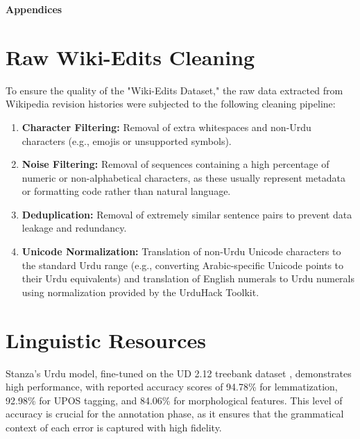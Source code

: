 \documentclass[11pt]{article}
\begin{document}
\begin{center}
    \textbf{\Large Appendices}
\end{center}
\noindent
\begin{appendices}
\section{Raw Wiki-Edits Cleaning}
\label{sec:Raw_Wiki-Edits_Cleaning}
To ensure the quality of the "Wiki-Edits Dataset," the raw data extracted from Wikipedia revision histories were subjected to the following cleaning pipeline:
\begin{enumerate}
\setlength{\itemsep}{0pt}  %
  \setlength{\itemsep}{0pt}
    \setlength{\parskip}{0pt}
    \item \textbf{Character Filtering:} Removal of extra whitespaces and non-Urdu characters (e.g., emojis or unsupported symbols).
    \item \textbf{Noise Filtering:} Removal of sequences containing a high percentage of numeric or non-alphabetical characters, as these usually represent metadata or formatting code rather than natural language.
    \item \textbf{Deduplication:} Removal of extremely similar sentence pairs to prevent data leakage and redundancy.
    \item \textbf{Unicode Normalization:} Translation of non-Urdu Unicode characters to the standard Urdu range (e.g., converting Arabic-specific Unicode points to their Urdu equivalents) and translation of English numerals to Urdu numerals using normalization provided by the UrduHack \cite{urduhack} Toolkit.
\end{enumerate}

\section{Linguistic Resources}
\label{Linguistic_Resources}
 Stanza's Urdu model, fine-tuned on the UD 2.12 treebank dataset \cite{bhathindi, palmer2009hindi}, demonstrates high performance, with reported accuracy scores of 94.78\% for lemmatization, 92.98\% for UPOS tagging, and 84.06\% for morphological features. This level of accuracy is crucial for the annotation phase, as it ensures that the grammatical context of each error is captured with high fidelity.


\end{appendices}
\end{document}
